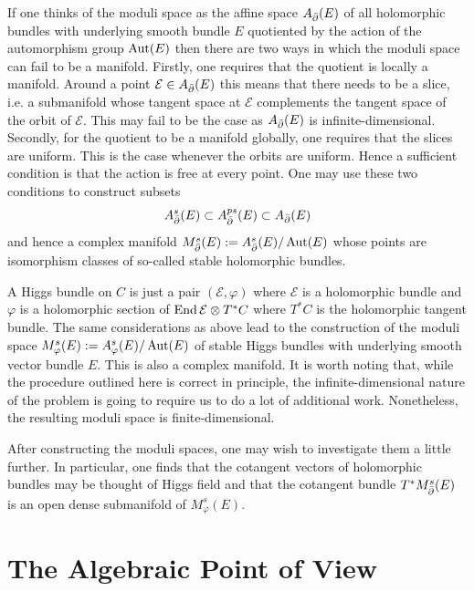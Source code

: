 \documentclass[12pt]{ociamthesis}  %
\begin{document}
If one thinks of the moduli space as the affine space $A_{{\bar{\partial}}}(E)$
of all holomorphic bundles with underlying smooth bundle $E$ quotiented
by the action of the automorphism group $\operatorname{Aut}(E)$ then there are two ways in which
the moduli space can fail to be a manifold. Firstly, one requires that
the quotient is locally a manifold. Around a point $\mathcal E\in A_{\bar{\partial}}(E)$
this means that there needs to be a slice, i.e. a submanifold whose
tangent space at $\mathcal E$ complements the tangent space of the orbit
of $\mathcal E$. This may fail to be the case as $A_{\bar{\partial}}(E)$ is
infinite-dimensional. Secondly, for the quotient to be a manifold
globally, one requires that the slices are uniform. This is the case
whenever the orbits are uniform. Hence a sufficient condition is that
the action is free at every point.
One may use these two conditions to construct subsets
\begin{align*}
  A^s_{\bar{\partial}}(E) \subset A^{ps}_{\bar{\partial}}(E) \subset A_{\bar{\partial}}(E)
\end{align*}
and hence a complex manifold $M_{\bar{\partial}}^s(E) := A^s_{\bar{\partial}}(E) / \operatorname{Aut}(E)$
whose points are isomorphism classes of so-called stable
holomorphic bundles.

A Higgs bundle on $C$ is just a pair $(\mathcal E,\varphi)$
where $\mathcal E$ is a holomorphic bundle and $\varphi$ is a
holomorphic section of $\operatorname{End}\mathcal E\otimes T^*C$ where $T^*C$ is the
holomorphic tangent bundle. The same considerations as above lead to
the construction of the moduli space $M^s_\varphi(E) := A^s_\varphi(E)/\operatorname{Aut}(E)$
of stable Higgs bundles with underlying smooth vector bundle $E$. This is also a
complex manifold. It is worth noting that, while the procedure outlined
here is correct in principle, the infinite-dimensional nature of the
problem is going to require us to do a lot of additional work.
Nonetheless, the resulting moduli space is finite-dimensional.

After constructing the moduli spaces, one may wish to investigate
them a little further. In particular, one finds that the cotangent
vectors of holomorphic bundles may be thought of Higgs field and that
the cotangent bundle $T^* M^s_{\bar{\partial}}(E)$ is an open dense submanifold
of $M^s_\varphi(E)$.

\section{The Algebraic Point of View}
\end{document}
